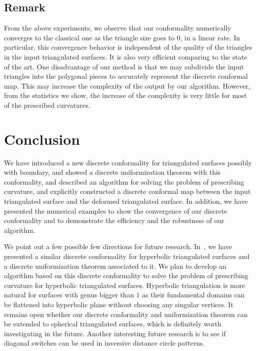 \documentclass[11pt]{article}
\begin{document}
\subsection{Remark}
From the above experiments, we observe that our conformality numerically converges
to the classical one as the triangle size goes to $0$, in a linear rate. In particular, 
this convergence behavior is independent of the quality of the triangles in the
input triangulated surfaces. It is also very efficient comparing to the state of the art. 
One disadvantage of our method is that we may subdivide the input triangles into the
polygonal pieces to accurately represent the discrete conformal map. This may increase
the complexity of the output by our algorithm. However, from the statistics we show,
the increase of the complexity is very little for most of the prescribed curvatures. 


\section{Conclusion}
We have introduced a new discrete conformality for triangulated surfaces possibly
with boundary, and showed a discrete uniformization theorem with this conformality, 
and described an algorithm for solving the problem of prescribing curvature, and 
explicitly constructed a discrete conformal map between the input triangulated surface
and the deformed triangulated surface.  
In addition, we have presented the numerical examples to show the convergence of 
our discrete conformality and to demonstrate the efficiency and the robustness
of our algorithm.

We point out a few possible few directions for future research. In~\cite{gglsw}, we 
have presented a similar discrete conformality for hyperbolic triangulated surfaces and 
a discrete uniformization theorem associated to it. We
plan to develop an algorithm based on this discrete conformality to solve the problem of 
prescribing curvature for hyperbolic triangulated surfaces. Hyperbolic triangulation is 
more natural for surfaces with genus bigger than $1$ as their fundamental domains can be 
flattened into hyperbolic plane without choosing any singular vertices.  
It remains open whether our discrete conformality and uniformization theorem can be extended
to spherical triangulated surfaces, which is definitely worth investigating in the future.  
Another interesting future research is to see if diagonal switches can be used in 
inversive distance circle patterns. 
\end{document}
